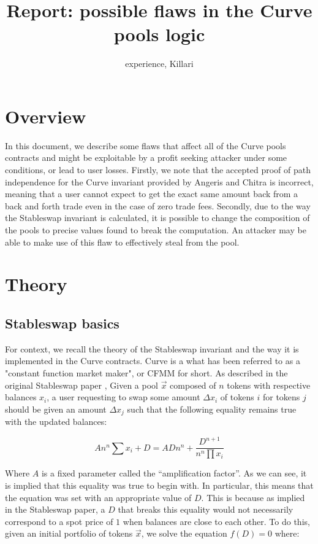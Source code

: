 \documentclass{article}
\title{Report: possible flaws in the Curve pools logic}
\author{experience, Killari}
\begin{document}
    \maketitle

    \section{Overview}

    In this document, we describe some flaws that affect all of the Curve pools contracts and might be exploitable by a profit seeking attacker under some conditions, or lead to user losses. Firstly, we note that the accepted proof of path independence for the Curve invariant provided by Angeris and Chitra \cite{angeris2020} is incorrect, meaning that a user cannot expect to get the exact same amount back from a back and forth trade even in the case of zero trade fees. Secondly, due to the way the Stableswap invariant is calculated, it is possible to change the composition of the pools to precise values found to break the computation. An attacker may be able to make use of this flaw to effectively steal from the pool. 

    \section{Theory}

    \subsection{Stableswap basics}

    For context, we recall the theory of the Stableswap invariant and the way it is implemented in the Curve contracts. Curve is a what has been referred to as a "constant function market maker", or CFMM for short. As described in the original Stableswap paper \cite{stableswap2019}, Given a pool $\vec{x}$ composed of $n$ tokens with respective balances $x_{i}$, a user requesting to swap some amount $\Delta x_{i}$ of tokens $i$ for tokens $j$ should be given an amount $\Delta x_{j}$ such that the following equality remains true with the updated balances: 

    \begin{equation}
        A n^{n} \sum x_{i}+D=A D n^{n}+\frac{D^{n+1}}{n^{n} \prod x_{i}}
    \end{equation}

    Where $A$ is a fixed parameter called the ``amplification factor''. As we can see, it is implied that this equality was true to begin with. In particular, this means that the equation was set with an appropriate value of $D$. This is because as implied in the Stableswap paper, a $D$ that breaks this equality would not necessarily correspond to a spot price of $1$ when balances are close to each other. To do this, given an initial portfolio of tokens $\vec{x}$, we solve the equation $f(D) = 0$ where: 
\end{document}
